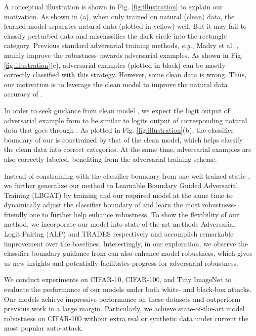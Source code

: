 \documentclass[10pt,twocolumn,letterpaper]{article}
\begin{document}
A conceptual illustration is shown in Fig. \ref{fig:illustration} to explain our motivation. As shown in (a), when only trained on natural (clean) data, the learned model  separates natural data (plotted in yellow) well. But it may fail to classify perturbed data and misclassifies the dark circle into the rectangle category. Previous standard adversarial training methods, {\it e.g.}, Madry et al. \cite{DBLP:conf/iclr/MadryMSTV18}, mainly improve the robustness towards adversarial examples. As shown in Fig. \ref{fig:illustration}(c), adversarial examples (plotted in black) can be mostly correctly classified with this strategy. However, some clean data is wrong. Thus, our motivation is to leverage the clean model  to improve the natural data accuracy of .

In order to seek guidance from clean model , we expect the logit output of adversarial example  from  to be similar to logits output of corresponding natural data  that goes through . As plotted in Fig. \ref{fig:illustration}(b), the classifier boundary of our  is constrained by that of the clean model, which helps classify the clean data into correct categories. At the same time, adversarial examples are also correctly labeled, benefiting from the adversarial training scheme.

Instead of constraining  with the classifier boundary from one well trained static ,
we further generalize our method to Learnable Boundary Guided Adversarial Training (LBGAT) by training  and our required model  at the same time to dynamically adjust the classifier boundary of  and learn the most robustness-friendly one to further help  enhance robustness. To show the flexibility of our method, we incorporate our model into state-of-the-art methods Adversarial Logit Pairing (ALP) \cite{DBLP:journals/corr/abs-1803-06373} and TRADES \cite{zhang2019theoretically} respectively and accomplish remarkable improvement over the baselines. Interestingly, in our exploration, we observe the classifier boundary guidance from  can also enhance model robustness, which gives us new insights and potentially facilitates progress for adversarial robustness. 

We conduct experiments on CIFAR-10, CIFAR-100, and Tiny ImageNet to evaluate the performance of our models under both white- and black-box attacks. Our models achieve impressive performance on these datasets and outperform previous work in a large margin. Particularly, we achieve state-of-the-art model robustness on CIFAR-100 without extra real or synthetic data under current the most popular auto-attack.
\end{document}
